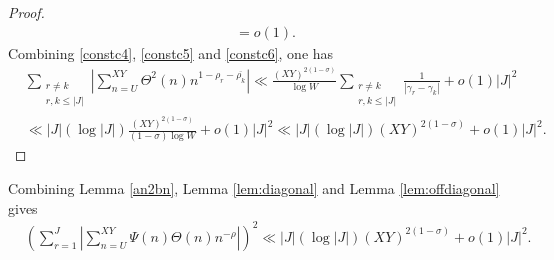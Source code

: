 \documentclass[reqno]{amsart}
\numberwithin{equation}{section}
\theoremstyle{remark}
\begin{document}
\begin{proof}
\begin{equation}
\begin{aligned}
        &=o(1).
    \end{aligned}
    \end{equation}
Combining \eqref{constc4}, \eqref{constc5} and \eqref{constc6}, one has
\begin{equation*}
    \begin{aligned}
         &\sum_{\substack{r\neq k\\r,k\le |J|}}\left|\sum_{n=U}^{XY}\Theta^2(n)n^{1-\rho_r-\overline{\rho_k}}\right|\ll\frac{(XY)^{2(1-\sigma)}}{\log W}\sum_{\substack{r\neq k\\r,k\le |J|}} \frac{1}{|\gamma_r-\gamma_k|}+o(1)|J|^2\\&\ll  |J|(\log|J|)\frac{(XY)^{2(1-\sigma)}}{(1-\sigma)\log W}+o(1)|J|^2\ll  |J|(\log|J|)(XY)^{2(1-\sigma)}+o(1)|J|^2.
    \end{aligned}
\end{equation*}
\end{proof}
Combining Lemma \ref{an2bn}, Lemma \ref{lem:diagonal} and Lemma \ref{lem:offdiagonal} gives
\begin{equation}\label{upperboundfinal}
 \begin{aligned}
    & \left(\sum_{r=1}^J\left|\sum_{n=U}^{XY}\Psi(n)\Theta(n) n^{-\rho}\right|\right)^2\ll|J|(\log|J|)(XY)^{2(1-\sigma)}+o(1)|J|^2.
\end{aligned}
\end{equation}
\end{document}
